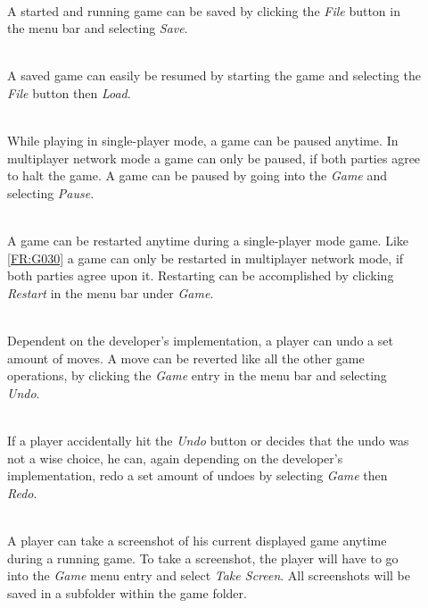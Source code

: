 \vspace{.5cm}

\begin{description}
   \item[] \textbf{} \\
   A started and running game can be saved by clicking the \emph{File} button in the menu bar and selecting \emph{Save}.
  \item[] \textbf{} \\
  A saved game can easily be resumed by starting the game and selecting the \emph{File} button then \emph{Load}.
\item[] \textbf{} \\
While playing in single-player mode, a game can be paused anytime. In multiplayer network mode a game can only be paused, if both parties agree to halt the game. A game can be paused by going into the \emph{Game} and selecting \emph{Pause}.
\item[] \textbf{} \\
A game can be restarted anytime during a single-player mode game. Like \ref{FR:G030} a game can only be restarted in multiplayer network mode, if both parties agree upon it. Restarting can be accomplished by clicking \emph{Restart} in the menu bar under \emph{Game}.
\item[] \textbf{} \\
Dependent on the developer's implementation, a \gls{player} can undo a set amount of moves. A move can be reverted like all the other game operations, by clicking the \emph{Game} entry in the menu bar and selecting \emph{Undo}.
\item[] \textbf{} \\
If a player accidentally hit the \emph{Undo} button or decides that the undo was not a wise choice, he can, again depending on the developer's implementation, redo a set amount of undoes by selecting \emph{Game} then \emph{Redo}.
\item[] \textbf{} \\
A player can take a screenshot of his current displayed game anytime during a running game. To take a screenshot, the player will have to go into the \emph{Game} menu entry and select \emph{Take Screen}. All screenshots will be saved in a subfolder within the game folder.
\end{description}

